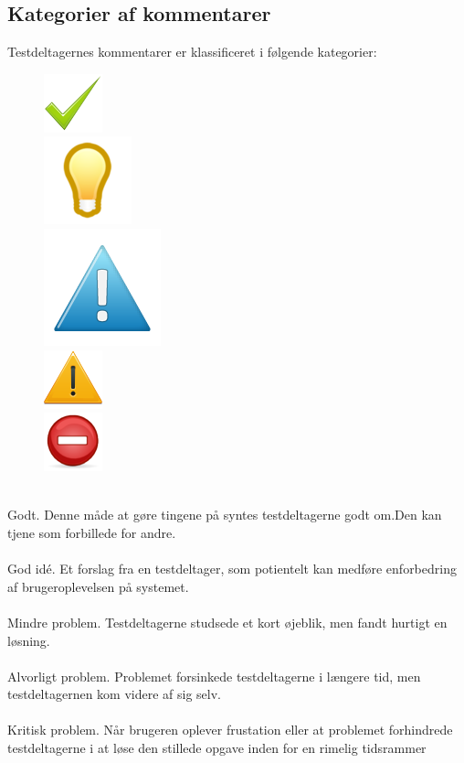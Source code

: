 \documentclass[12pt]{article}
\begin{document}
\subsection*{Kategorier af kommentarer}
Testdeltagernes kommentarer er klassificeret i følgende kategorier: \vspace{1mm}
 \begin{figure}
  \includegraphics[scale=0.4]{Billeder/godt} \vspace{5mm} \\
  \includegraphics[scale=0.3]{Billeder/ide}   \vspace{3mm}\\
  \includegraphics[scale=0.3]{Billeder/mindre}  \\ 
  \includegraphics[scale=0.5]{Billeder/alvorligt}  \\ \vspace{1mm}
    \includegraphics[scale=0.6]{Billeder/kritisk}
\end{figure}\\ 
Godt. Denne måde at gøre tingene på syntes testdeltagerne godt om.Den kan tjene som forbillede for andre.\\ \\
God idé. Et forslag fra en testdeltager, som potientelt kan medføre enforbedring af brugeroplevelsen på systemet. \\ \\
Mindre problem. Testdeltagerne studsede et kort øjeblik, men fandt hurtigt en løsning. \\ \\
Alvorligt problem. Problemet forsinkede testdeltagerne i længere tid, men testdeltagernen kom videre af sig selv. \\ \\
Kritisk problem. Når brugeren oplever frustation eller at problemet forhindrede testdeltagerne i at løse den stillede opgave inden for en rimelig tidsrammer\\
\end{document}
